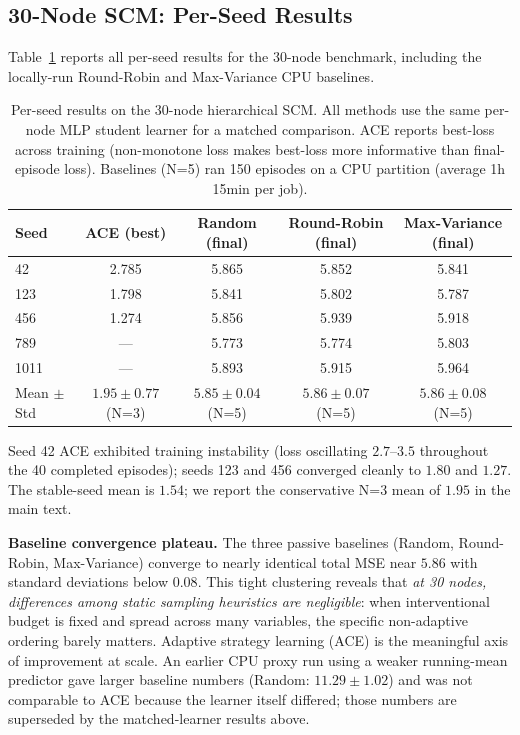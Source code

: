 \subsection{30-Node SCM: Per-Seed Results}
\label{app:30node-detail}

Table~\ref{tab:30node-perseed} reports all per-seed results for the 30-node benchmark, including the locally-run Round-Robin and Max-Variance CPU baselines.

\begin{table}[h]
\centering
\caption{Per-seed results on the 30-node hierarchical SCM. All methods use the same per-node MLP student learner for a matched comparison. ACE reports best-loss across training (non-monotone loss makes best-loss more informative than final-episode loss). Baselines (N=5) ran 150 episodes on a CPU partition (average 1h 15min per job).}
\label{tab:30node-perseed}
\small
\begin{tabular}{@{}l cccc@{}}
\toprule
Seed & ACE (best) & Random (final) & Round-Robin (final) & Max-Variance (final) \\
\midrule
42   & 2.785 & 5.865 & 5.852 & 5.841 \\
123  & 1.798 & 5.841 & 5.802 & 5.787 \\
456  & 1.274 & 5.856 & 5.939 & 5.918 \\
789  & ---   & 5.773 & 5.774 & 5.803 \\
1011 & ---   & 5.893 & 5.915 & 5.964 \\
\midrule
Mean $\pm$ Std & $1.95\pm0.77$ (N=3) & $5.85\pm0.04$ (N=5) & $5.86\pm0.07$ (N=5) & $5.86\pm0.08$ (N=5) \\
\bottomrule
\end{tabular}
\end{table}

Seed 42 ACE exhibited training instability (loss oscillating $2.7$--$3.5$ throughout the 40 completed episodes); seeds 123 and 456 converged cleanly to $1.80$ and $1.27$. The stable-seed mean is $1.54$; we report the conservative N=3 mean of $1.95$ in the main text.

\textbf{Baseline convergence plateau.} The three passive baselines (Random, Round-Robin, Max-Variance) converge to nearly identical total MSE near $5.86$ with standard deviations below $0.08$. This tight clustering reveals that \emph{at 30 nodes, differences among static sampling heuristics are negligible}: when interventional budget is fixed and spread across many variables, the specific non-adaptive ordering barely matters. Adaptive strategy learning (ACE) is the meaningful axis of improvement at scale. An earlier CPU proxy run using a weaker running-mean predictor gave larger baseline numbers (Random: $11.29\pm1.02$) and was not comparable to ACE because the learner itself differed; those numbers are superseded by the matched-learner results above.


